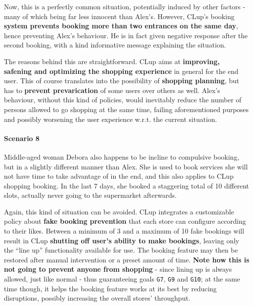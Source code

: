 Now, this is a perfectly common situation, potentially induced by other factors - many of which being far less innocent than Alex's. \newline
However, CLup's booking \textbf{system prevents booking more than two entrances on the same day}, hence preventing Alex's behaviour. He is in fact given negative response after the second booking, with a kind informative message explaining the situation.

The reasons behind this are straightforward. CLup aims at \textbf{improving, safening and optimizing the shopping experience} in general for the end user. This of course translates into the possibility of \textbf{shopping planning}, but has to \textbf{prevent prevarication} of some users over others as well. \newline
Alex's behaviour, without this kind of policies, would inevitably reduce the number of persons allowed to go shopping at the same time, failing aforementioned purposes and possibly worsening the user experience w.r.t. the current situation.

\paragraph{Scenario 8}

Middle-aged woman Debora also happens to be incline to \guillemotleft compulsive booking\guillemotright, but in a slightly different manner than Alex. \newline
She is used to book services she will not have time to take advantage of in the end, and this also applies to CLup shopping booking. In the last 7 days, she booked a staggering total of 10 different slots, actually never going to the supermarket afterwards.

Again, this kind of situation can be avoided. CLup integrates a customizable policy about \textbf{fake booking prevention} that each store can configure according to their likes. \newline
Between a minimum of 3 and a maximum of 10 fake bookings will result in CLup \textbf{shutting off user's ability to make bookings}, leaving only the ``line up'' functionality available for use. The booking feature may then be restored after manual intervention or a preset amount of time. \newline
\textbf{Note how this is not going to prevent anyone from shopping} - since lining up is always allowed, just like normal - thus guaranteeing goals \texttt{G7}, \texttt{G9} and \texttt{G10}; at the same time though, it helps the booking feature works at its best by reducing disruptions, possibly increasing the overall stores' throughput.

